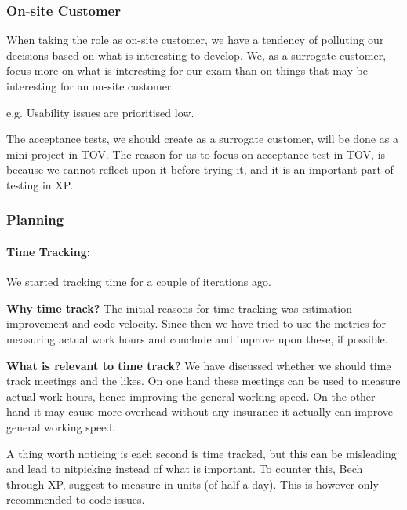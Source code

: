 \subsubsection{On-site Customer}
When taking the role as on-site customer, we have a tendency of polluting our decisions based on what is interesting to develop. We, as a surrogate customer, focus more on what is interesting for our exam than on things that may be interesting for an on-site customer.

e.g. Usability issues are prioritised low.

The acceptance tests, we should create as a surrogate customer, will be done as a mini project in TOV. The reason for us to focus on acceptance test in TOV, is because we cannot reflect upon it before trying it, and it is an important part of testing in XP.

\subsubsection{Planning}
\paragraph{Time Tracking:}
We started tracking time for a couple of iterations ago.

\textbf{Why time track?}
The initial reasons for time tracking was estimation improvement and code velocity.
Since then we have tried to use the metrics for measuring actual work hours and conclude and improve upon these, if possible.

\textbf{What is relevant to time track?}
We have discussed whether we should time track meetings and the likes. On one hand these meetings can be used to measure actual work hours, hence improving the general working speed. On the other hand it may cause more overhead without any insurance it actually can improve general working speed. 

A thing worth noticing is each second is time tracked, but this can be misleading and lead to nitpicking instead of what is important. To counter this, Bech through XP, suggest to measure in units (of half a day). This is however only recommended to code issues. 

